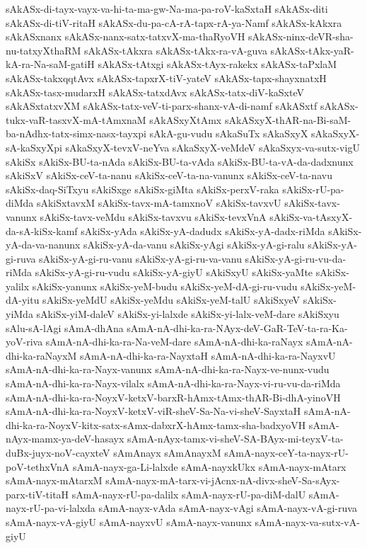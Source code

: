 {sAkASx-di-tayx-vayx-va-hi-ta-ma-gw-Na-ma-pa-roV-kaSxtaH
sAkASx-diti
sAkASx-di-tiV-ritaH
sAkASx-du-pa-cA-rA-tapx-rA-ya-Namf
sAkASx-kAkxra
sAkASxnanx
sAkASx-nanx-satx-tatxvX-ma-thaRyoVH
sAkASx-ninx-deVR-sha-nu-tatxyXthaRM
sAkASx-tAkxra
sAkASx-tAkx-ra-vA-guva
sAkASx-tAkx-yaR-kA-ra-Na-saM-gatiH
sAkASx-tAtxgi
sAkASx-tAyx-rakekx
sAkASx-taPxlaM
sAkASx-takxqqtAvx
sAkASx-tapxrX-tiV-yateV
sAkASx-tapx-shayxnatxH
sAkASx-tasx-mudarxH
sAkASx-tatxdAvx
sAkASx-tatx-diV-kaSxteV
sAkASxtatxvXM
sAkASx-tatx-veV-ti-parx-shanx-vA-di-namf
sAkASxtf
sAkASx-tukx-vaR-tasxvX-mA-tAmxnaM
sAkASxyXtAmx
sAkASxyX-thAR-na-Bi-saM-ba-nAdhx-tatx-simx-nasx-tayxpi
sAkA-gu-vudu
sAkaSuTx
sAkaSxyX
sAkaSxyX-sA-kaSxyXpi
sAkaSxyX-tevxV-neYva
sAkaSxyX-veMdeV
sAkaSxyx-va-sutx-vigU
sAkiSx
sAkiSx-BU-ta-nAda
sAkiSx-BU-ta-vAda
sAkiSx-BU-ta-vA-da-dadxnunx
sAkiSxV
sAkiSx-ceV-ta-nanu
sAkiSx-ceV-ta-na-vanunx
sAkiSx-ceV-ta-navu
sAkiSx-daq-SiTxyu
sAkiSxge
sAkiSx-giMta
sAkiSx-perxV-raka
sAkiSx-rU-pa-diMda
sAkiSxtavxM
sAkiSx-tavx-mA-tamxnoV
sAkiSx-tavxvU
sAkiSx-tavx-vanunx
sAkiSx-tavx-veMdu
sAkiSx-tavxvu
sAkiSx-tevxVnA
sAkiSx-va-tAsxyX-da-sA-kiSx-kamf
sAkiSx-yAda
sAkiSx-yA-dadudx
sAkiSx-yA-dadx-riMda
sAkiSx-yA-da-va-nanunx
sAkiSx-yA-da-vanu
sAkiSx-yAgi
sAkiSx-yA-gi-ralu
sAkiSx-yA-gi-ruva
sAkiSx-yA-gi-ru-vanu
sAkiSx-yA-gi-ru-va-vanu
sAkiSx-yA-gi-ru-vu-da-riMda
sAkiSx-yA-gi-ru-vudu
sAkiSx-yA-giyU
sAkiSxyU
sAkiSx-yaMte
sAkiSx-yalilx
sAkiSx-yanunx
sAkiSx-yeM-budu
sAkiSx-yeM-dA-gi-ru-vudu
sAkiSx-yeM-dA-yitu
sAkiSx-yeMdU
sAkiSx-yeMdu
sAkiSx-yeM-talU
sAkiSxyeV
sAkiSx-yiMda
sAkiSx-yiM-daleV
sAkiSx-yi-lalxde
sAkiSx-yi-lalx-veM-dare
sAkiSxyu
sAlu-sA-lAgi
sAmA-dhAna
sAmA-nA-dhi-ka-ra-NAyx-deV-GaR-TeV-ta-ra-Ka-yoV-riva
sAmA-nA-dhi-ka-ra-Na-veM-dare
sAmA-nA-dhi-ka-raNayx
sAmA-nA-dhi-ka-raNayxM
sAmA-nA-dhi-ka-ra-NayxtaH
sAmA-nA-dhi-ka-ra-NayxvU
sAmA-nA-dhi-ka-ra-Nayx-vanunx
sAmA-nA-dhi-ka-ra-Nayx-ve-nunx-vudu
sAmA-nA-dhi-ka-ra-Nayx-vilalx
sAmA-nA-dhi-ka-ra-Nayx-vi-ru-vu-da-riMda
sAmA-nA-dhi-ka-ra-NoyxV-ketxV-barxR-hAmx-tAmx-thAR-Bi-dhA-yinoVH
sAmA-nA-dhi-ka-ra-NoyxV-ketxV-viR-sheV-Sa-Na-vi-sheV-SayxtaH
sAmA-nA-dhi-ka-ra-NoyxV-kitx-satx-sAmx-dabxrX-hAmx-tamx-sha-badxyoVH
sAmA-nAyx-mamx-ya-deV-hasayx
sAmA-nAyx-tamx-vi-sheV-SA-BAyx-mi-teyxV-ta-duBx-juyx-noV-cayxteV
sAmAnayx
sAmAnayxM
sAmA-nayx-ceY-ta-nayx-rU-poV-tethxVnA
sAmA-nayx-ga-Li-lalxde
sAmA-nayxkUkx
sAmA-nayx-mAtarx
sAmA-nayx-mAtarxM
sAmA-nayx-mA-tarx-vi-jAcnx-nA-divx-sheV-Sa-sAyx-parx-tiV-titaH
sAmA-nayx-rU-pa-dalilx
sAmA-nayx-rU-pa-diM-dalU
sAmA-nayx-rU-pa-vi-lalxda
sAmA-nayx-vAda
sAmA-nayx-vAgi
sAmA-nayx-vA-gi-ruva
sAmA-nayx-vA-giyU
sAmA-nayxvU
sAmA-nayx-vanunx
sAmA-nayx-va-sutx-vA-giyU
}
